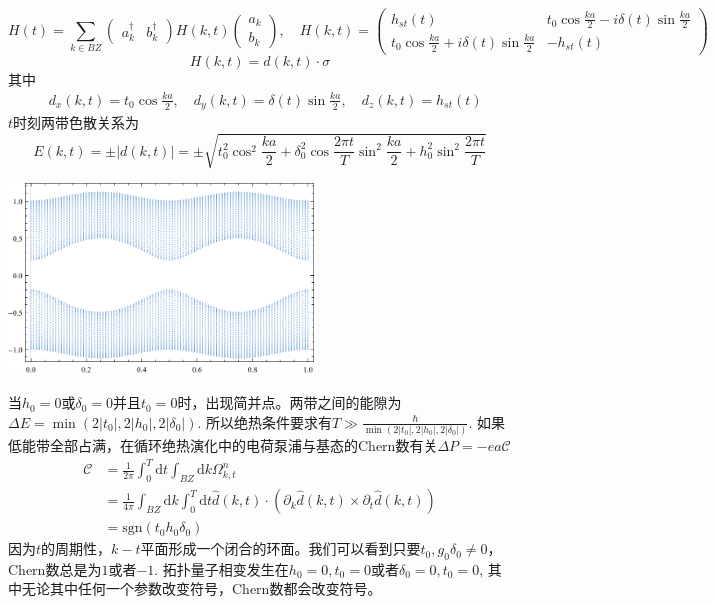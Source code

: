 \documentclass{article}
\numberwithin{equation}{subsection}
\begin{document}
\begin{equation}
    H(t)=\sum_{k\in BZ}\begin{pmatrix}
        a_k^\dagger&b_k^\dagger
    \end{pmatrix}H(k,t)\begin{pmatrix}
        a_k\\
        b_k
    \end{pmatrix},\quad H(k,t)=\begin{pmatrix}
        h_{st}(t)&t_0\cos\frac{ka}{2}-i\delta(t)\sin\frac{ka}{2}\\
        t_0\cos\frac{ka}{2}+i\delta(t)\sin\frac{ka}{2}&-h_{st}(t)
    \end{pmatrix}
\end{equation}
\begin{equation}
    H(k,t)=d(k,t)\cdot\sigma
\end{equation}
其中
\begin{equation}
    \begin{split}
        &d_x(k,t)=t_0\cos\frac{ka}{2},\quad d_y(k,t)=\delta(t)\sin\frac{ka}{2},\quad d_z(k,t)=h_{st}(t)
    \end{split}
\end{equation}
$t$时刻两带色散关系为
\begin{equation}
    E(k,t)=\pm|d(k,t)|=\pm\sqrt{t_0^2\cos^2\frac{ka}{2}+\delta_0^2\cos\frac{2\pi t}{T}\sin^2\frac{ka}{2}+h_0^2\sin^2\frac{2\pi t}{T}}
\end{equation}
\begin{center}
    \includegraphics[height=2in]{rice-mele.pdf}
\end{center}
当$h_0=0$或$\delta_0=0$并且$t_0=0$时，出现简并点。两带之间的能隙为$\Delta E=\min(2|t_0|,2|h_0|,2|\delta_0|)$. 所以绝热条件要求有$T\gg\frac{\hbar}{\min(2|t_0|,2|h_0|,2|\delta_0|)}$. 如果低能带全部占满，在循环绝热演化中的电荷泵浦与基态的Chern数有关$\Delta P=-ea\mathcal{C}$
\begin{equation}
    \begin{split}
        \mathcal{C}&=\frac{1}{2\pi}\int_{0}^{T}\mathrm{d}t\int_{BZ}\mathrm{d}k\Omega_{k,t}^n\\
        &=\frac{1}{4\pi}\int_{BZ}\mathrm{d}k\int_{0}^{T}\mathrm{d}t\hat{d}(k,t)\cdot(\partial_k\hat{d}(k,t)\times\partial_t\hat{d}(k,t))\\
        &=\mathrm{sgn}(t_0h_0\delta_0)
    \end{split}
\end{equation}
因为$t$的周期性，$k-t$平面形成一个闭合的环面。我们可以看到只要$t_0,g_0\delta_0\neq0$，Chern数总是为$1$或者$-1$. 拓扑量子相变发生在$h_0=0,t_0=0$或者$\delta_0=0,t_0=0$, 其中无论其中任何一个参数改变符号，Chern数都会改变符号。
\end{document}
